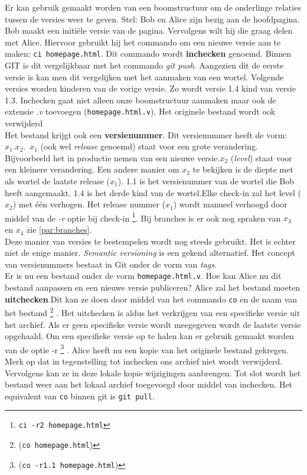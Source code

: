 Er kan gebruik gemaakt worden van een boomstructuur om de onderlinge relaties tussen de versies weer te geven. Stel: Bob en Alice zijn bezig aan de hoofdpagina. Bob maakt een initiële versie van de pagina. Vervolgens wilt hij die graag delen met Alice. Hiervoor gebruikt hij het commando om een nieuwe versie aan te maken: \Verb+ci homepage.html+. Dit commando wordt \textbf{inchecken} genoemd. Binnen GIT is dit vergelijkbaar met het commando \textit{git push}. Aangezien dit de eerste versie is kan men dit vergelijken met het aanmaken van een wortel. Volgende versies worden kinderen van de vorige versie. Zo wordt versie 1.4 kind van versie 1.3. Inchecken gaat niet alleen onze boomstructuur aanmaken maar ook de extensie \textit{.v} toevoegen (\verb+homepage.html.v+). Het originele bestand wordt ook verwijderd\\

Het bestand krijgt ook een \textbf{versienummer}. Dit versienummer heeft de vorm: $x_1.x_2$.\ $x_1$ (ook wel \textit{release} genoemd) staat voor een grote verandering. Bijvoorbeeld het in productie nemen van een nieuwe versie.$x_2$ (\textit{level}) staat voor een kleinere verandering. Een andere manier om $x_2$ te bekijken is de diepte met als wortel de laatste release ($x_1$). 1.1 is het versienummer van de wortel die Bob heeft aangemaakt. 1.4 is het derde kind van de wortel.Elke check-in zal het level ($x_2$) met één verhogen. Het release nummer ($x_1$) wordt manueel verhoogd door middel van de \textit{-r} optie bij check-in \footnote{\Verb+ci -r2 homepage.html+}. Bij branches is er ook nog spraken van $x_3$ en $x_4$ zie \ref{par:branches}.\\

Deze manier van versies te bestempelen wordt nog steeds gebruikt. Het is echter niet de enige manier. \textit{Semantic versioning} is een gekend alternatief. Het concept van versienummers bestaat in Git onder de vorm van \textit{tags}.\\

Er is nu een bestand onder de vorm \verb+homepage.html.v+. Hoe kan Alice nu dit bestand aanpassen en een nieuwe versie publiceren? Alice zal het bestand moeten \textbf{uitchecken}.Dit kan ze doen door middel van het commando \verb+co+ en de naam van het bestand \footnote{(\Verb+co homepage.html+)} . Het uitchecken is aldus het verkrijgen van een specifieke versie uit het archief. Als er geen specifieke versie wordt meegegeven wordt de laatste versie opgehaald. Om een specifieke versie op te halen kan er gebruik gemaakt worden van de optie -r  \footnote{(\Verb+co -r1.1 homepage.html+)} . Alice heeft nu een kopie van het originele bestand gekregen. Merk op dat in tegenstelling tot inchecken ons archief niet wordt verwijderd. Vervolgens kan ze in deze lokale kopie wijzigingen aanbrengen. Tot slot wordt het bestand weer aan het lokaal archief toegevoegd door middel van inchecken. Het equivalent van \verb+co+ binnen git is \verb+git pull+.\\

